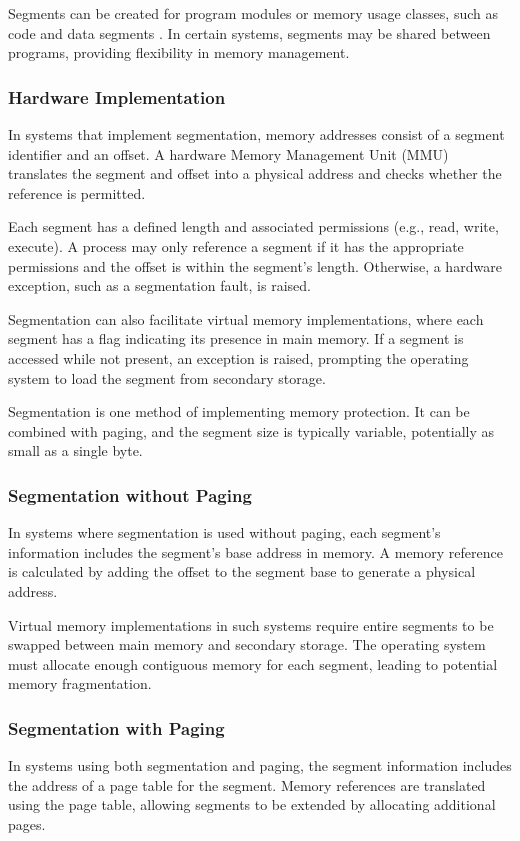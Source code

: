 \documentclass{book}
\begin{document}
Segments can be created for program modules or memory usage classes, such as code and data segments . In certain systems, segments may be shared between programs, providing flexibility in memory management.

\subsubsection{Hardware Implementation}
In systems that implement segmentation, memory addresses consist of a segment identifier and an offset. A hardware Memory Management Unit (MMU) translates the segment and offset into a physical address and checks whether the reference is permitted.

Each segment has a defined length and associated permissions (e.g., read, write, execute). A process may only reference a segment if it has the appropriate permissions and the offset is within the segment's length. Otherwise, a hardware exception, such as a segmentation fault, is raised.

Segmentation can also facilitate virtual memory implementations, where each segment has a flag indicating its presence in main memory. If a segment is accessed while not present, an exception is raised, prompting the operating system to load the segment from secondary storage.

Segmentation is one method of implementing memory protection. It can be combined with paging, and the segment size is typically variable, potentially as small as a single byte.

\subsubsection{Segmentation without Paging}
In systems where segmentation is used without paging, each segment's information includes the segment's base address in memory. A memory reference is calculated by adding the offset to the segment base to generate a physical address.

Virtual memory implementations in such systems require entire segments to be swapped between main memory and secondary storage. The operating system must allocate enough contiguous memory for each segment, leading to potential memory fragmentation.

\subsubsection{Segmentation with Paging}
In systems using both segmentation and paging, the segment information includes the address of a page table for the segment. Memory references are translated using the page table, allowing segments to be extended by allocating additional pages.
\end{document}
